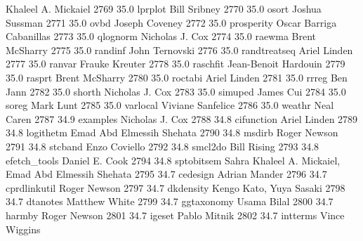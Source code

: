                                    Khaleel A. Mickaiel                     
  2769     35.0    lprplot       Bill Sribney                            
  2770     35.0    osort         Joshua Sussman                          
  2771     35.0    ovbd          Joseph Coveney                          
  2772     35.0    prosperity    Oscar Barriga Cabanillas                
  2773     35.0    qlognorm      Nicholas J. Cox                         
  2774     35.0    raewma        Brent McSharry                          
  2775     35.0    randinf       John Ternovski                          
  2776     35.0    randtreatseq  Ariel Linden                            
  2777     35.0    ranvar        Frauke Kreuter                          
  2778     35.0    raschfit      Jean-Benoit Hardouin                    
  2779     35.0    rasprt        Brent McSharry                          
  2780     35.0    roctabi       Ariel Linden                            
  2781     35.0    rrreg         Ben Jann                                
  2782     35.0    shorth        Nicholas J. Cox                         
  2783     35.0    simuped       James Cui                               
  2784     35.0    soreg         Mark Lunt                               
  2785     35.0    varlocal      Viviane Sanfelice                       
  2786     35.0    weathr        Neal Caren                              
  2787     34.9    examples      Nicholas J. Cox                         
  2788     34.8    cifunction    Ariel Linden                            
  2789     34.8    logithetm     Emad Abd Elmessih Shehata               
  2790     34.8    msdirb        Roger Newson                            
  2791     34.8    stcband       Enzo Coviello                           
  2792     34.8    smcl2do       Bill Rising                             
  2793     34.8    efetch_tools  Daniel E. Cook                          
  2794     34.8    sptobitsem    Sahra Khaleel A. Mickaiel, Emad Abd     
                                   Elmessih Shehata                        
  2795     34.7    cedesign      Adrian Mander                           
  2796     34.7    cprdlinkutil  Roger Newson                            
  2797     34.7    dkdensity     Kengo Kato, Yuya Sasaki                 
  2798     34.7    dtanotes      Matthew White                           
  2799     34.7    ggtaxonomy    Usama Bilal                             
  2800     34.7    harmby        Roger Newson                            
  2801     34.7    igeset        Pablo Mitnik                            
  2802     34.7    intterms      Vince Wiggins                           
